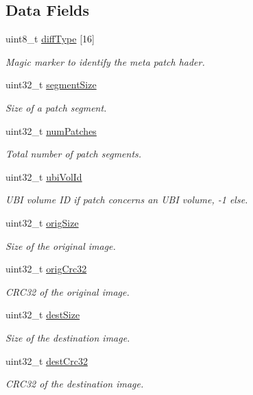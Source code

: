 \subsection*{Data Fields}
\begin{DoxyCompactItemize}
\item 
uint8\+\_\+t \hyperlink{struct_delta_patch_meta_header__t_a915e5fc5b0f34fa2357381f7d3fc317d}{diff\+Type} \mbox{[}16\mbox{]}
\begin{DoxyCompactList}\small\item\em Magic marker to identify the meta patch hader. \end{DoxyCompactList}\item 
uint32\+\_\+t \hyperlink{struct_delta_patch_meta_header__t_a2be92cdf178eca749b374d77bd926255}{segment\+Size}
\begin{DoxyCompactList}\small\item\em Size of a patch segment. \end{DoxyCompactList}\item 
uint32\+\_\+t \hyperlink{struct_delta_patch_meta_header__t_a0a4ff5a208c59f0d71f6b4867d7b01e5}{num\+Patches}
\begin{DoxyCompactList}\small\item\em Total number of patch segments. \end{DoxyCompactList}\item 
uint32\+\_\+t \hyperlink{struct_delta_patch_meta_header__t_a7ec5f36b04569ceb022443953ba4cc01}{ubi\+Vol\+Id}
\begin{DoxyCompactList}\small\item\em U\+BI volume ID if patch concerns an U\+BI volume, -\/1 else. \end{DoxyCompactList}\item 
uint32\+\_\+t \hyperlink{struct_delta_patch_meta_header__t_a7fc9388882cef84bf866ad7eb6bd1a41}{orig\+Size}
\begin{DoxyCompactList}\small\item\em Size of the original image. \end{DoxyCompactList}\item 
uint32\+\_\+t \hyperlink{struct_delta_patch_meta_header__t_ac7869da2c1746db8e18c13073994586e}{orig\+Crc32}
\begin{DoxyCompactList}\small\item\em C\+R\+C32 of the original image. \end{DoxyCompactList}\item 
uint32\+\_\+t \hyperlink{struct_delta_patch_meta_header__t_a461597a63fa08f6d8154d8783b42fbc2}{dest\+Size}
\begin{DoxyCompactList}\small\item\em Size of the destination image. \end{DoxyCompactList}\item 
uint32\+\_\+t \hyperlink{struct_delta_patch_meta_header__t_ad9ecfc6ecd1094b005c10c4173e1966d}{dest\+Crc32}
\begin{DoxyCompactList}\small\item\em C\+R\+C32 of the destination image. \end{DoxyCompactList}\end{DoxyCompactItemize}



